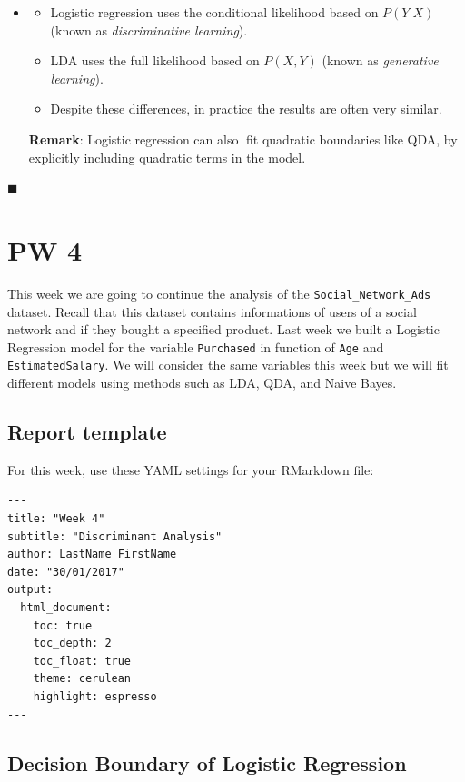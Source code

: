 \documentclass[]{book}
\providecommand{\tightlist}{%
  \setlength{\itemsep}{0pt}\setlength{\parskip}{0pt}}
\newenvironment{rmdblock}[1]
  {\begin{shaded*}
  \begin{itemize}
  \renewcommand{\labelitemi}{
    \raisebox{-.7\height}[0pt][0pt]{
      {\setkeys{Gin}{width=2em,keepaspectratio}\texttt{[image: img/icons/\#1]}}
    }
  }
  \item
  }
  {
  \end{itemize}
  \end{shaded*}
  }
\newenvironment{rmdinsight}
  {\begin{rmdblock}{insight}}
  {\end{rmdblock}}
\begin{document}
\begin{rmdinsight}
\begin{itemize}
\tightlist
\item
  Logistic regression uses the conditional likelihood based on
  \(P(Y|X)\) (known as \emph{discriminative learning}).
\item
  LDA uses the full likelihood based on \(P(X,Y )\) (known as
  \emph{generative learning}).
\item
  Despite these differences, in practice the results are often very
  similar.
\end{itemize}

\textbf{Remark}: Logistic regression can also fit quadratic boundaries
like QDA, by explicitly including quadratic terms in the model.
\end{rmdinsight}

◼

\chapter*{PW 4}\label{pw-4}

This week we are going to continue the analysis of the
\texttt{Social\_Network\_Ads} dataset. Recall that this dataset contains
informations of users of a social network and if they bought a specified
product. Last week we built a Logistic Regression model for the variable
\texttt{Purchased} in function of \texttt{Age} and
\texttt{EstimatedSalary}. We will consider the same variables this week
but we will fit different models using methods such as LDA, QDA, and
Naive Bayes.

\section*{Report template}\label{report-template-1}

For this week, use these YAML settings for your RMarkdown file:

\begin{verbatim}
---
title: "Week 4"
subtitle: "Discriminant Analysis"
author: LastName FirstName
date: "30/01/2017"
output:
  html_document:
    toc: true
    toc_depth: 2
    toc_float: true
    theme: cerulean
    highlight: espresso
---
\end{verbatim}

\section*{Decision Boundary of Logistic
Regression}\label{decision-boundary-of-logistic-regression}
\end{document}
